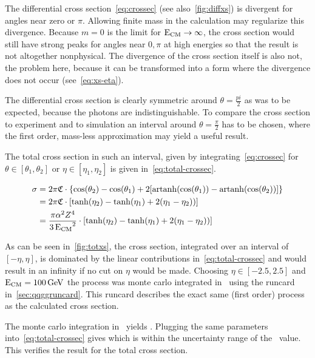 The differential cross section~\eqref{eq:crossec} (see
also~\ref{fig:diffxs}) is divergent for angles near zero or
\(\pi\). Allowing finite mass in the calculation may regularize this
divergence. Because \(m=0\) is the limit for
\(\operatorname{E_{\text{CM}}}\rightarrow\infty\), the cross section would still have strong
peaks for angles near \(0,\pi\) at high energies so that the result is
not altogether nonphysical. The divergence of the cross section itself
is also not, the problem here, because it can be transformed into a
form where the divergence does not occur (see~\eqref{eq:xs-eta}).

The differential cross section is clearly symmetric around
\(\theta=\frac{pi}{2}\) as was to be expected, because the photons are
indistinguishable. To compare the cross section to experiment and to
simulation an interval around \(\theta=\frac{\pi}{2}\) has to be
chosen, where the first order, mass-less approximation may yield a
useful result.

The total cross section in such an interval, given by
integrating~\eqref{eq:crossec} for \(\theta\in [\theta_1, \theta_2]\)
or \(\eta\in [\eta_1, \eta_2]\) is given
in~\eqref{eq:total-crossec}.

\begin{equation}
  \label{eq:total-crossec}
  \begin{split}
  \sigma &=
  2\pi\mathfrak{C}\cdot\qty{\cos(\theta_2)-\cos(\theta_1)+2\qty[\operatorname{artanh}(\cos(\theta_1))
    - \operatorname{artanh}(\cos(\theta_2))]} \\
  &=2\pi\mathfrak{C}\cdot\qty[\tanh(\eta_2) - \tanh(\eta_1) + 2(\eta_1
  - \eta_2))] \\
  &={\frac{\pi\alpha^2Z^4}{3\operatorname{E_{\text{CM}}}^2}}\cdot\qty[\tanh(\eta_2) - \tanh(\eta_1) + 2(\eta_1
  - \eta_2))]
  \end{split}
\end{equation}

As can be seen in~\ref{fig:totxs}, the cross section, integrated over
an interval of \([-\eta, \eta]\), is dominated by the linear
contributions in~\ref{eq:total-crossec} and would result in an
infinity if no cut on \(\eta\) would be made.  Choosing
\(\eta\in [-2.5,2.5]\) and \(\operatorname{E_{\text{CM}}}=\SI{100}{\giga\electronvolt}\) the
process was monte carlo integrated in \sherpa\ using the runcard
in~\ref{sec:qqggruncard}. This runcard describes the exact same (first
order) process as the calculated cross section.

The monte carlo integration in \sherpa\ yields
. Plugging the same parameters
into~\eqref{eq:total-crossec} gives  which is within the
uncertainty range of the \sherpa\ value. This verifies the result for
the total cross section.

